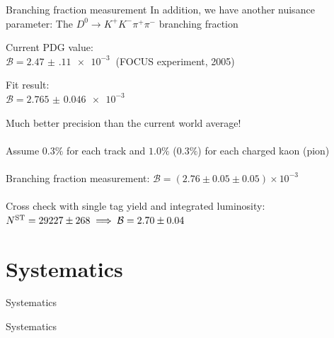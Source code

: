 \documentclass{beamer}
\begin{document}
\begin{frame}{Branching fraction measurement}
  \vspace{0.0cm}
  {\Large In addition, we have another nuisance parameter: The $D^0\to K^+K^-\pi^+\pi^-$ branching fraction\\}
  \begin{center}
    Current PDG value:\\
    $\mathcal{B} = \SI{2.47(11)e-3}{}$ (FOCUS experiment, 2005)
  \end{center}
  \vspace{-0.5cm}
  \begin{center}
    Fit result:\\
    $\mathcal{B} = \SI{2.765(46)e-3}{}$
  \end{center}
  Much better precision than the current world average!\\~\\
  Assume $0.3\%$ for each track and $1.0\%$ ($0.3\%$) for each charged kaon (pion)\\~\\
  Branching fraction measurement: $\mathcal{B} = (2.76 \pm 0.05 \pm 0.05)\times 10^{-3}$\\~\\
  Cross check with single tag yield and integrated luminosity: $N^{\rm ST} = 29227 \pm 268\implies \mathcal{B} = 2.70 \pm 0.04$
\end{frame}

\section{Systematics}
\begin{frame}{Systematics}
  \begin{center}
    {\huge Systematics}
  \end{center}
\end{frame}
\end{document}
